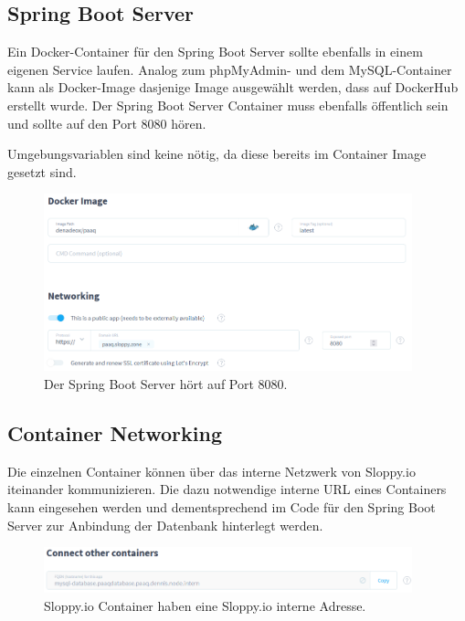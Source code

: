 \documentclass[../main.tex]{subfiles}
\begin{document}
	\subsection{Spring Boot Server}
	\par Ein Docker-Container für den Spring Boot Server sollte ebenfalls in einem eigenen Service laufen. Analog zum phpMyAdmin- und dem MySQL-Container kann als Docker-Image dasjenige Image ausgewählt werden, dass auf DockerHub erstellt wurde. Der Spring Boot Server Container muss ebenfalls öffentlich sein und sollte auf den Port 8080 hören.
	\par Umgebungsvariablen sind keine nötig, da diese bereits im Container Image gesetzt sind.
	
	\begin{figure}[H]
		\centering
		\includegraphics[width=0.95\textwidth]{../images/SloppySpringServer} 
		\caption{Der Spring Boot Server hört auf Port 8080.}
		\label{fig:SloppySpringServer}
	\end{figure}
	
	\subsection{Container Networking}
	\par Die einzelnen Container können über das interne Netzwerk von Sloppy.io iteinander kommunizieren. Die dazu notwendige interne URL eines Containers kann eingesehen werden und dementsprechend im Code für den Spring Boot Server zur Anbindung der Datenbank hinterlegt werden.
	\begin{figure}[H]
		\centering
		\includegraphics[width=0.95\textwidth]{../images/SloppyConnectContainers} 
		\caption{Sloppy.io Container haben eine Sloppy.io interne Adresse.}
		\label{fig:SloppyConnectContainers}
	\end{figure}
	
\end{document}
